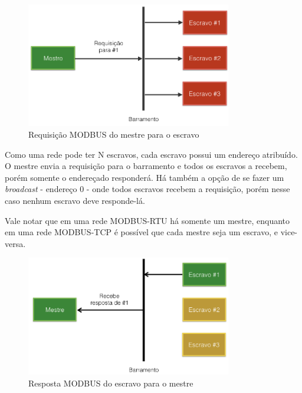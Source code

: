         \begin{figure}[H]
          \begin{center}
            \includegraphics[width=0.8\textwidth,natwidth=1024,natheight=768]{assets/images/modbus-req-1.png}
            \caption{Requisição MODBUS do mestre para o escravo}
            \label{fig:modbus-req-1}
          \end{center}
        \end{figure}

        Como uma rede pode ter N escravos, cada escravo possui um endereço atribuído. O mestre envia a requisição para o barramento e todos os escravos a recebem, porém somente o endereçado responderá. Há também a opção de se fazer um \textit{broadcast} - endereço 0 - onde todos escravos recebem a requisição, porém nesse caso nenhum escravo deve responde-lá.

        Vale notar que em uma rede MODBUS-RTU há somente um mestre, enquanto em uma rede MODBUS-TCP é possível que cada mestre seja um escravo, e vice-versa.

        \begin{figure}[H]
          \begin{center}
            \includegraphics[width=0.8\textwidth,natwidth=1024,natheight=768]{assets/images/modbus-req-2.png}
            \caption{Resposta MODBUS do escravo para o mestre}
            \label{fig:modbus-req-2}
          \end{center}
        \end{figure}

